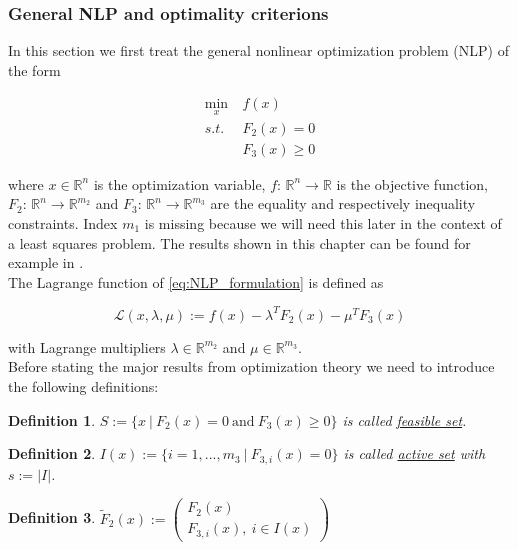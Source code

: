 \documentclass{scrartcl}[12pt, halfparskip]
\numberwithin{equation}{section}
\numberwithin{figure}{section}
\numberwithin{table}{section}
\newtheorem{Definition}{Definition}
\begin{document}
\subsubsection{General NLP and optimality criterions}
In this section we first treat the general nonlinear optimization problem (NLP) of the form

\begin{align}
	\min_x & \ f(x) \label{eq:NLP_formulation} \\
	s.t. & \ F_2(x) = 0 \nonumber \\
	& \ F_3(x) \ge 0 \nonumber
\end{align}

where $x \in \mathbb{R}^n$ is the optimization variable, $f\text{: } \mathbb{R}^n \rightarrow \mathbb{R}$ is the objective function, $F_2\text{: } \mathbb{R}^n \rightarrow \mathbb{R}^{m_2}$ and $F_3\text{: } \mathbb{R}^n \rightarrow \mathbb{R}^{m_3}$ are the equality and respectively inequality constraints. Index $m_1$ is missing because we will need this later in the context of a least squares problem. The results shown in this chapter can be found for example in \cite{nonlinear_optimiziation_wright}. \\

The Lagrange function of \cref{eq:NLP_formulation} is defined as

\begin{equation}
	\mathcal{L}(x,\lambda,\mu) := f(x) - \lambda^T F_2(x) - \mu^T F_3(x)
\end{equation}

with Lagrange multipliers $\lambda \in \mathbb{R}^{m_2}$ and $\mu \in \mathbb{R}^{m_3}$. \\

Before stating the major results from optimization theory we need to introduce the following definitions:

\begin{Definition}
	$S := \{ x \ | \ F_2(x) = 0 \ \text{and} \ F_3(x) \ge 0 \}$ is called \underline{feasible set}.
\end{Definition}

\begin{Definition}
	$I(x) := \{ i=1,...,m_3 \ | \ F_{3,i}(x) = 0 \}$ is called \underline{active set} with $s := \vert I \vert$.
\end{Definition}

\begin{Definition}
	$\tilde{F}_2(x) := 
	\begin{pmatrix}
		F_2(x) \\
		F_{3,i}(x), \ i \in I(x) 
	\end{pmatrix}$
\end{Definition}
\end{document}
